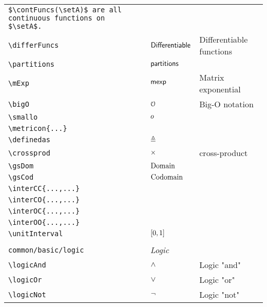 \begin{longtable}{lll}
{{\begin{minipage}[]{8cm}
{\small{\texttt{\$\textbackslash contFuncs(\textbackslash setA)\$ are all continuous functions on \$\textbackslash setA\$.}}}\end{minipage}%
}%
}%
\\ 
 {\color[rgb]{0.5,0.5,0.5}\texttt{\textbackslash differFuncs}} & $\mathsf{Differentiable}$ &  Differentiable functions\\ 
 {\color[rgb]{0.5,0.5,0.5}\texttt{\textbackslash partitions}} & $\mathsf{partitions}$ & \\ 
 {\color[rgb]{0.5,0.5,0.5}\texttt{\textbackslash mExp}} & $\mathsf{mexp}$ &  Matrix exponential\\ 
 {\color[rgb]{0.5,0.5,0.5}\texttt{\textbackslash bigO}} & $\mathcal{O}$ &  Big-O notation\\ 
 {\color[rgb]{0.5,0.5,0.5}\texttt{\textbackslash smallo}} & $o$ & \\ 
 {\color[rgb]{0.5,0.5,0.5}\texttt{\textbackslash metricon\{...\}}} &  & \\ 
 {\color[rgb]{0.5,0.5,0.5}\texttt{\textbackslash definedas}} & $\mathrel{\triangleq}$ & \\ 
 {\color[rgb]{0.5,0.5,0.5}\texttt{\textbackslash crossprod}} & $\mathrel{\times}$ &  cross-product\\ 
 {\color[rgb]{0.5,0.5,0.5}\texttt{\textbackslash gsDom}} & $\text{Domain}$ &  \\ 
 {\color[rgb]{0.5,0.5,0.5}\texttt{\textbackslash gsCod}} & $\text{Codomain}$ &  \\ 
 {\color[rgb]{0.5,0.5,0.5}\texttt{\textbackslash interCC\{...,...\}}} &  & \\ 
 {\color[rgb]{0.5,0.5,0.5}\texttt{\textbackslash interCO\{...,...\}}} &  & \\ 
 {\color[rgb]{0.5,0.5,0.5}\texttt{\textbackslash interOC\{...,...\}}} &  & \\ 
 {\color[rgb]{0.5,0.5,0.5}\texttt{\textbackslash interOO\{...,...\}}} &  & \\ 
 {\color[rgb]{0.5,0.5,0.5}\texttt{\textbackslash unitInterval}} & $[0,1]$ & \\ 
  &  & \\ 
 {\color[rgb]{0.5,0.5,0.5}\texttt{common/basic/logic}} & \multicolumn{2}{l}{\emph{Logic}}\\ 
 \hline
{\color[rgb]{0.5,0.5,0.5}\texttt{\textbackslash logicAnd}} & $\wedge$ &  Logic "and"\\ 
 {\color[rgb]{0.5,0.5,0.5}\texttt{\textbackslash logicOr}} & $\vee$ &  Logic "or"\\ 
 {\color[rgb]{0.5,0.5,0.5}\texttt{\textbackslash logicNot}} & $\neg$ &  Logic "not"\\ 

\end{longtable}
